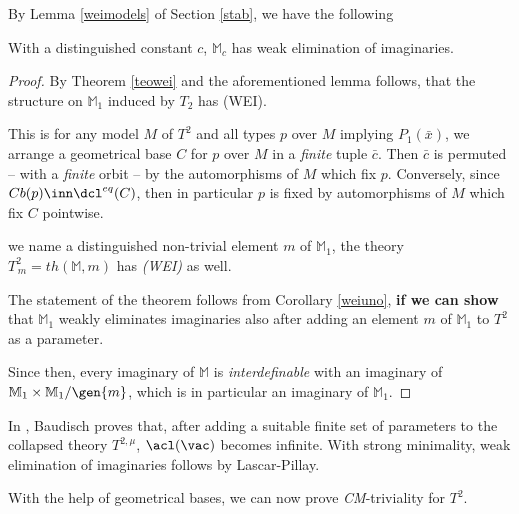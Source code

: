 \medskip
By Lemma \ref{weimodels} of Section \ref{stab}, we have the following
\begin{cor}\label{weiuno}
With a distinguished constant $c$, $\mathbb{M}_{c}$ has weak elimination of imaginaries.
\end{cor}
\begin{proof}
By Theorem \ref{teowei} and the aforementioned lemma follows, that the structure on $\mathbb{M}_{1}$
induced by $T_{2}$ has (WEI).

This is for any model $M$
of $T^{2}$ and all types $p$ over $M$ implying $P_{1}(\bar x)$, we arrange a geometrical base
$C$ for $p$ over $M$ in a {\em finite} tuple $\bar c$. Then $\bar c$ is permuted -- with a {\em finite} orbit --
by the automorphisms of $M$ which fix $p$. Conversely, since $Cb(p)\inn\dcl^{eq}(C)$, then
in particular $p$ is fixed by automorphisms of $M$ which fix $C$ pointwise.

we name a distinguished non-trivial element $m$ of $\mathbb{M}_{1}$, the theory $T^{2}_{\,m}=\mathit{th}(\mathbb{M},m)$ has {\em (WEI)} as well.

The statement of the theorem follows from Corollary \ref{weiuno}, {\bf if we can show} that $\mathbb{M}_{1}$ weakly
eliminates imaginaries also after adding an element $m$ of $\mathbb{M}_{1}$ to $T^{2}$ as a parameter.

Since then, every imaginary of $\mathbb{M}$ is {\em interdefinable} with an imaginary
of $\mathbb{M}_{1}\times\mathbb{M}_{1}/\gen{m}$, which is in particular an imaginary of $\mathbb{M}_{1}$.
\end{proof}

\medskip
In \cite{bad}, Baudisch proves that, after adding a suitable finite set of parameters to the collapsed
theory $T^{2,\mu}$, $\acl(\vac)$ becomes
infinite. With strong minimality, weak elimination of imaginaries follows by Lascar-Pillay.

\medskip
With the help of geometrical bases, we can now prove {\sl CM}-triviality for $T^{2}$.

%

